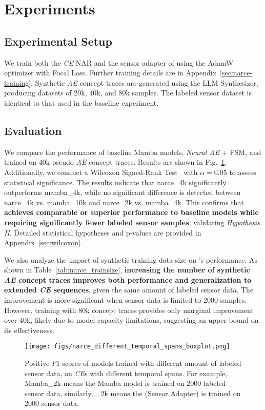 \section{Experiments}

\subsection{Experimental Setup}
We train both the \emph{CE} NAR and the sensor adapter of \narce{} using the AdamW optimizer with Focal Loss. Further training details are in Appendix~\ref{sec:narce-training}. Synthetic \emph{AE} concept traces are generated using the LLM Synthesizer, producing datasets of 20k, 40k, and 80k samples. The labeled sensor dataset is identical to that used in the baseline experiment.



\subsection{Evaluation}  

We compare the performance of baseline Mamba models, \emph{Neural AE} + FSM, and \narce{} trained on 40k pseudo \emph{AE} concept traces. Results are shown in Fig.~\ref{fig:narce_different_temporal_spans_boxplot}. Additionally, we conduct a Wilcoxon Signed-Rank Test~\cite{wilcoxon} with $\alpha=0.05$ to assess statistical significance. The results indicate that narce\_4k significantly outperforms mamba\_4k, while no significant difference is detected between narce\_4k vs. mamba\_10k and narce\_2k vs. mamba\_4k. This confirms that \textbf{\narce{} achieves comparable or superior performance to baseline models while requiring significantly fewer labeled sensor samples}, validating \emph{Hypothesis II}. Detailed statistical hypotheses and p-values are provided in Appendix~\ref{sec:wilcoxon}.  

We also analyze the impact of synthetic training data size on \narce{}'s performance. As shown in Table~\ref{tab:narce_trainsize}, \textbf{increasing the number of synthetic \emph{AE} concept traces improves both performance and generalization to extended \emph{CE} sequences}, given the same amount of labeled sensor data. The improvement is more significant when sensor data is limited to 2000 samples. However, training with 80k concept traces provides only marginal improvement over 40k, likely due to model capacity limitations, suggesting an upper bound on its effectiveness.  


\begin{figure}[t]
    \centering
\texttt{[image: figs/narce\_different\_temporal\_spans\_boxplot.png]}
    \caption{Positive $F1$ scores of models trained with different amount of labeled sensor data, on \emph{CE}s with different temporal spans. For example, Mamba\_2k means the Mamba model is trained on 2000 labeled sensor data, similarly, \narce{}\_2k means the \narce{} (Sensor Adapter) is trained on 2000 sensor data.}
    \label{fig:narce_different_temporal_spans_boxplot}
    \vspace{-1em}
\end{figure}


